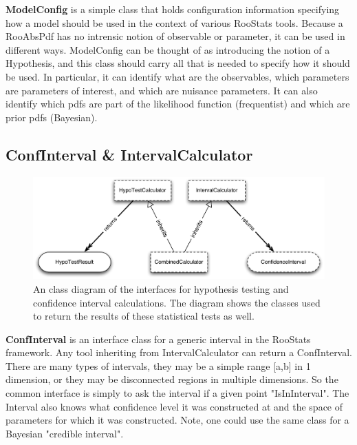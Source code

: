 \documentclass[11pt]{article}
\begin{document}


\textbf{ModelConfig} is a simple class that holds configuration information specifying how a model should be used in the context of various RooStats tools.  Because a RooAbsPdf has no intrensic notion of observable or parameter, it can be used in different ways.  ModelConfig can be thought of as introducing the notion of a Hypothesis, and this class should carry all that is needed to specify how it should be used.  In particular, it can identify what are the observables, which parameters are parameters of interest, and which are nuisance parameters.  It can also identify which pdfs are part of the likelihood function (frequentist) and which are prior pdfs (Bayesian).



\newpage
\subsection{ConfInterval \& IntervalCalculator}

\begin{figure}[htbp]
\begin{center}
\includegraphics[width=\textwidth]{RooStats_OverviewOfInterfaces.pdf}
\caption{An class diagram of the interfaces for hypothesis testing and confidence interval calculations.  The diagram shows the classes used to return the results of these statistical tests as well.}
\label{fig:OverviewOfInterfaces}
\end{center}
\end{figure}

\textbf{ConfInterval} is an interface class for a generic interval in the RooStats framework.
Any tool inheriting from IntervalCalculator can return a ConfInterval.
There are many types of intervals, they may be a simple range [a,b] in 1 dimension,
or they may be disconnected regions in multiple dimensions.
So the common interface is simply to ask the interval if a given point "IsInInterval".
The Interval also knows what confidence level it was constructed at and the space of 
parameters for which it was constructed.
Note, one could use the same class for a Bayesian "credible interval".
\end{document}
